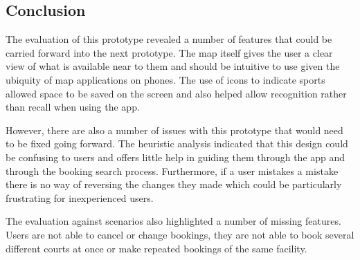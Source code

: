 \subsection{Conclusion}
\label{sub:content_conclusion}

The evaluation of this prototype revealed a number of features that could be
carried forward into the next prototype. The map itself gives the user a clear
view of what is available near to them and should be intuitive to use given the
ubiquity of map applications on phones. The use of icons to indicate sports
allowed space to be saved on the screen and also helped allow recognition
rather than recall when using the app.

However, there are also a number of issues with this prototype that would need
to be fixed going forward. The heuristic analysis indicated that this design
could be confusing to users and offers little help in guiding them through the
app and through the booking search process. Furthermore, if a user mistakes a
mistake there is no way of reversing the changes they made which could be
particularly frustrating for inexperienced users.

The evaluation against scenarios also highlighted a number of missing features.
Users are not able to cancel or change bookings, they are not able to book
several different courts at once or make repeated bookings of the same
facility.

\restoregeometry%
